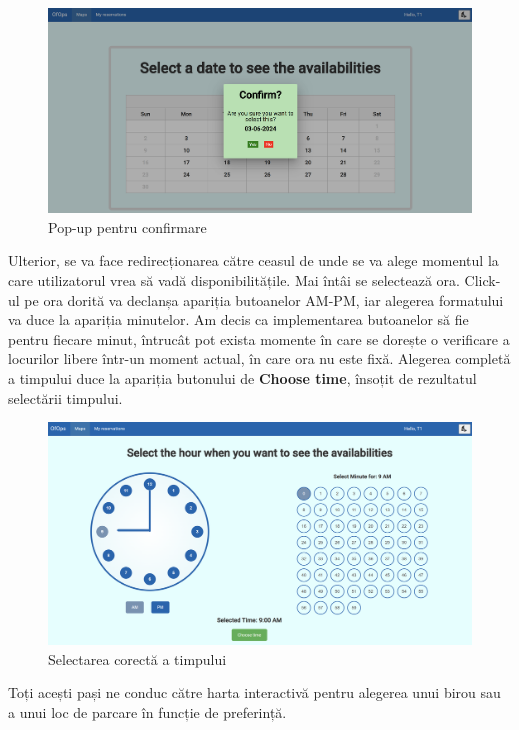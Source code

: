 \newpage

\begin{figure}[!htb]
    \centering
    \includegraphics[width=0.9\linewidth]{images/calendar bun.png}
    \caption{Pop-up pentru confirmare}
    \label{fig:calendarbun}
\end{figure}

Ulterior, se va face redirecționarea către ceasul de unde se va alege momentul la care utilizatorul vrea să vadă disponibilitățile. Mai întâi se selectează ora. Click-ul pe ora dorită va declanșa apariția butoanelor AM-PM, iar alegerea formatului va duce la apariția minutelor. Am decis ca implementarea butoanelor să fie pentru fiecare minut, întrucât pot exista momente în care se dorește o verificare a locurilor libere într-un moment actual, în care ora nu este fixă. Alegerea completă a timpului duce la apariția butonului de \textbf{Choose time}, însoțit de rezultatul selectării timpului.

\newpage

\begin{figure}[!htb]
    \centering
    \includegraphics[width=0.9\linewidth]{images/timp.png}
    \caption{Selectarea corectă a timpului}
    \label{fig:timp}
\end{figure}

Toți acești pași ne conduc către harta interactivă pentru alegerea unui birou sau a unui loc de parcare în funcție de preferință.

